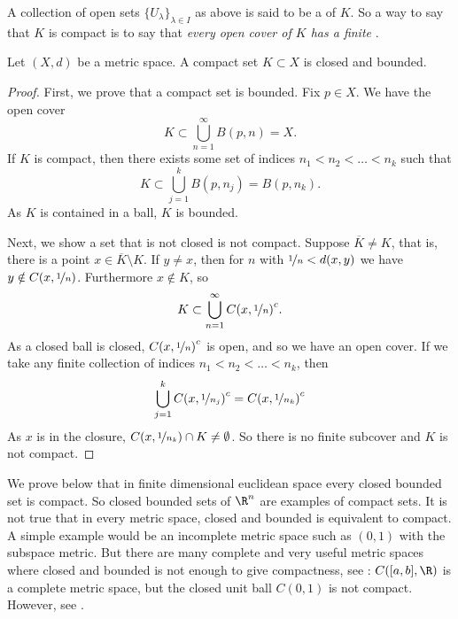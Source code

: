 \documentclass[12pt]{book}
\begin{document}
A collection of open sets $\{ U_{\lambda} \}_{\lambda \in I}$ as above is
said to be a \emph{} of $K$.
So a way to say that
$K$ is compact is to say that \emph{every open cover of $K$ has a finite
}.

\begin{prop}
Let $(X,d)$ be a metric space.
A compact set $K \subset X$ is closed and
bounded.
\end{prop}

\begin{proof}
First, we prove that a compact set is bounded.
Fix $p \in X$.
We have the open cover
\begin{equation*}
K \subset \bigcup_{n=1}^\infty B(p,n) = X .
\end{equation*}
If $K$ is compact, then there exists some set of indices
$n_1 < n_2 < \ldots < n_k$ such that
\begin{equation*}
K \subset \bigcup_{j=1}^k B(p,n_j) = B(p,n_k) .
\end{equation*}
As $K$ is contained in a ball, $K$ is bounded.

Next, we show a set that is not closed is not compact.
Suppose 
$\overline{K} \not= K$, that is, there is a point $x \in \overline{K}
\setminus K$.
If $y \not= x$, then for $n$
with $\nicefrac{1}{n} < d(x,y)$ we have
$y \notin C(x,\nicefrac{1}{n})$. Furthermore $x \notin K$, so
\begin{equation*}
K \subset \bigcup_{n=1}^\infty {C(x,\nicefrac{1}{n})}^c .
\end{equation*}
As a closed ball is closed, ${C(x,\nicefrac{1}{n})}^c$ is open, and
so we have an open cover.
If we take any
finite collection of indices $n_1 < n_2 < \ldots < n_k$, then 
\begin{equation*}
\bigcup_{j=1}^k {C(x,\nicefrac{1}{n_j})}^c 
=
{C(x,\nicefrac{1}{n_k})}^c 
\end{equation*}
As $x$ is in the closure,
$C(x,\nicefrac{1}{n_k}) \cap K \not= \emptyset$.
So there is no
finite subcover and $K$ is not compact.
\end{proof}

We prove below that 
in finite dimensional euclidean space
every closed bounded set is compact.
So closed bounded sets
of $\R^n$ are examples of compact sets.
It is not true that in every metric space, closed and bounded is equivalent
to compact.
A simple example would be an incomplete metric space such as
$(0,1)$ with the subspace metric.
But there are many complete and very useful metric spaces where closed and bounded is not
enough to give compactness, see
: $C([a,b],\R)$ is a complete metric
space, but the closed unit ball $C(0,1)$ is not compact.
However, see
.
\end{document}
